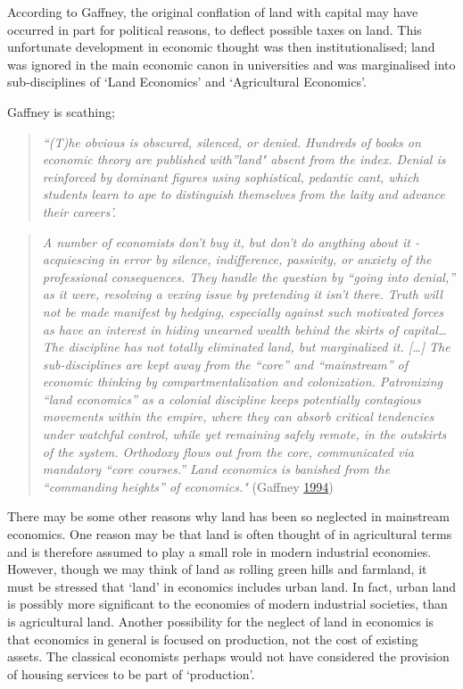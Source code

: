 \documentclass[]{tufte-handout}
\begin{document}
According to Gaffney, the original conflation of land with capital may
have occurred in part for political reasons, to deflect possible taxes
on land. This unfortunate development in economic thought was then
institutionalised; land was ignored in the main economic canon in
universities and was marginalised into sub-disciplines of `Land
Economics' and `Agricultural Economics'.

Gaffney is scathing;

\begin{quote}
\emph{``(T)he obvious is obscured, silenced, or denied. Hundreds of
books on economic theory are published with''land" absent from the
index. Denial is reinforced by dominant figures using sophistical,
pedantic cant, which students learn to ape to distinguish themselves
from the laity and advance their careers'.}
\end{quote}

\begin{quote}
\emph{A number of economists don't buy it, but don't do anything about
it - acquiescing in error by silence, indifference, passivity, or
anxiety of the professional consequences. They handle the question by
``going into denial,'' as it were, resolving a vexing issue by
pretending it isn't there. Truth will not be made manifest by hedging,
especially against such motivated forces as have an interest in hiding
unearned wealth behind the skirts of capital\ldots{} The discipline has
not totally eliminated land, but marginalized it. {[}\ldots{}{]} The
sub-disciplines are kept away from the ``core'' and ``mainstream'' of
economic thinking by compartmentalization and colonization. Patronizing
``land economics'' as a colonial discipline keeps potentially contagious
movements within the empire, where they can absorb critical tendencies
under watchful control, while yet remaining safely remote, in the
outskirts of the system. Orthodoxy flows out from the core, communicated
via mandatory ``core courses.'' Land economics is banished from the
``commanding heights'' of economics."} (Gaffney
\protect\hyperlink{ref-Gaffney1994}{1994})
\end{quote}

There may be some other reasons why land has been so neglected in
mainstream economics. One reason may be that land is often thought of in
agricultural terms and is therefore assumed to play a small role in
modern industrial economies. However, though we may think of land as
rolling green hills and farmland, it must be stressed that `land' in
economics includes urban land. In fact, urban land is possibly more
significant to the economies of modern industrial societies, than is
agricultural land. Another possibility for the neglect of land in
economics is that economics in general is focused on production, not the
cost of existing assets. The classical economists perhaps would not have
considered the provision of housing services to be part of `production'.
\end{document}
